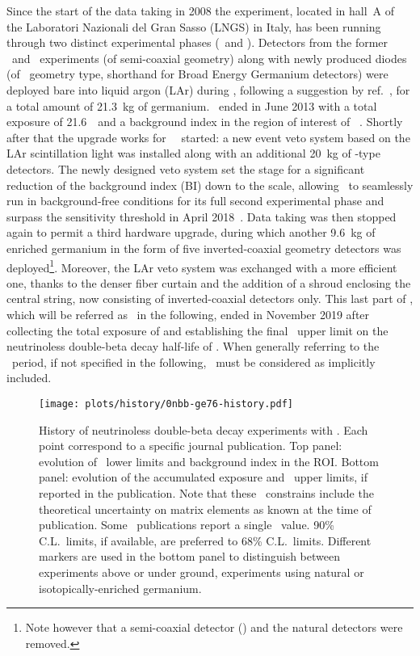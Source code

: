 Since the start of the data taking in 2008 the experiment, located in hall~A of the
Laboratori Nazionali del Gran Sasso (LNGS) in Italy, has been running through two distinct
experimental phases (\phaseone\ and \phasetwo). Detectors from the former \hdm\ and \igex\
experiments (of semi-coaxial geometry) along with newly produced diodes (of \bege\
geometry type, shorthand for Broad Energy Germanium detectors) were deployed bare into
liquid argon (LAr) during \phaseone, following a suggestion by ref.~\cite{Heusser1995},
for a total amount of 21.3~kg of germanium. \phaseone\ ended in June 2013 with a total
exposure of 21.6~\kgyr\ and a background index in the region of interest of
\pIbi~\cite{Agostini2016}.  Shortly after that the upgrade works for \gerda\ \phasetwo\ started:
a new event veto system based on the LAr scintillation light was installed along with an
additional 20~kg of \bege-type detectors.  The newly designed veto system set the stage for a
significant reduction of the background index (BI) down to the \powctsper{-4} scale, allowing
\gerda\ to seamlessly run in background-free conditions for its full second experimental phase
and surpass the \powtenyr{26} sensitivity threshold in April 2018~\cite{Agostini2019a}.
Data taking was then stopped again to permit a third hardware upgrade, during which
another 9.6~kg of enriched germanium in the form of five inverted-coaxial geometry
detectors was deployed\footnote{Note however that a semi-coaxial detector (\ANG{1}) and
the natural \GTF{} detectors were removed.}. Moreover, the LAr veto system was exchanged
with a more efficient one, thanks to the denser fiber curtain and the addition of a shroud
enclosing the central string, now consisting of inverted-coaxial detectors only. This last
part of \phasetwo, which will be referred as \phasetwop\ in the following, ended in
November 2019 after collecting the total exposure of \gexpo and
establishing the final \gerda\ upper limit on the neutrinoless double-beta decay half-life
of \gerdafinallimit. When generally referring to the \phasetwo\ period, if not specified
in the following, \phasetwop\ must be considered as implicitly included.
\begin{figure}
  \centering
  \texttt{[image: plots/history/0nbb-ge76-history.pdf]}
  \caption[placeholder]{%
    History of neutrinoless double-beta decay experiments with \gesix. Each point
    correspond to a specific journal publication. Top panel: evolution of \thalfzero\
    lower limits and background index in the ROI. Bottom panel: evolution of the
    accumulated exposure and \mbb\ upper limits, if reported in the publication. Note that
    these \mbb\ constrains include the theoretical uncertainty on matrix elements as known
    at the time of publication. Some \hdm\ publications report a single \mbb\ value. 90\%
    C.L.~limits, if available, are preferred to 68\% C.L.~limits. Different markers are
    used in the bottom panel to distinguish between experiments above or under ground,
    experiments using natural or isotopically-enriched germanium\protect\footnotemark.
  }\label{img:exp:ge76-history}
\end{figure}

